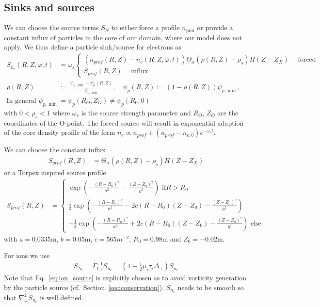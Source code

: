 \subsection{Sinks and sources} \label{sec:sources}
We can choose the source terms $S_N$ to either force a profile
$n_{\text{prof}}$ or provide a constant influx of particles in the
core of our domain, where our model does not apply.
We thus define a particle sink/source for electrons as
\begin{align} \label{eq:electron_source}
  S_{n_e}(R,Z,\varphi, t) &= \omega_s \begin{cases}
    (n_{prof}(R,Z) - n_e(R,Z,\varphi, t))\Theta_\alpha( \rho(R,Z) - \rho_s) H(Z-Z_X) \quad \text{ forced}\\
    S_{prof}(R,Z)\quad \text{ influx}
    \end{cases} \\
    \rho(R,Z) &:= \frac{\psi_{p,\min}- \psi_p(R,Z) }{\psi_{p,\min}}, \quad
    \psi_p(R,Z):= (1-\rho(R,Z))\psi_{p,\min},\\ \text{In general }\psi_{p,\min} &= \psi_p(R_O, Z_O) \neq\psi_{p}(R_0,0)
\end{align}
with $0 < \rho_{s}<1$
where $\omega_s$ is the source strength parameter and $R_O$, $Z_O$ are the coordinates of the O-point.
The forced source will result in exponential adaption of the core
density profile of the form $n_e \propto n_{prof}+(n_{prof}-n_{e,0})e^{-\omega_st}$.

We can choose the constant influx
\begin{align} \label{eq:electron_source_influx}
  S_{prof}(R,Z) &= \Theta_\alpha( \rho(R,Z) - \rho_s) H(Z-Z_X)
\end{align}
or a Torpex inspired source profile
\begin{align} \label{eq:electron_source_torpex}
  S_{prof}(R,Z) &= 
  \begin{cases}
    \exp\left( - \frac{(R-R_0)^2}{a^2 }- \frac{(Z-Z_0)^2}{b^2}\right) \text{ if} R > R_0 \\
    \frac{1}{2}\exp\left( - \frac{(R-R_0)^2}{a^2} -2c(R-R_0)(Z-Z_0)- \frac{(Z-Z_0)^2}{b^2} \right) \\
  +\frac{1}{2}\exp\left( - \frac{(R-R_0)^2}{a^2} +2c(R-R_0)(Z-Z_0)- \frac{(Z-Z_0)^2}{b^2} \right) \text{ else}
              \end{cases}
\end{align}
with $a=0.0335$m, $b=0.05$m, $c=565m^{-2}$, $R_0=0.98$m and $Z_0=-0.02$m.


For ions we use
\begin{align}
    S_{N_i} = \Gamma_{1,i}^{-1} S_{n_e} = \left(1-\frac{1}{2}\mu_i \tau_i \Delta_\perp\right) S_{n_e}
  \label{eq:ion_source}
\end{align}
Note that Eq.~\eqref{eq:ion_source} is explicitly chosen as to avoid vorticity generation
by the particle source (cf.~Section~\ref{sec:conservation}). $S_{n_e}$ needs to be smooth
so that $\nabla_\perp^2 S_{n_e}$ is well defined.

